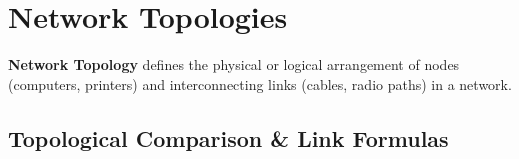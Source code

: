 \section{Network Topologies}

\textbf{Network Topology} defines the physical or logical arrangement of nodes (computers, printers) and interconnecting links (cables, radio paths) in a network.

\subsection{Topological Comparison \& Link Formulas}


